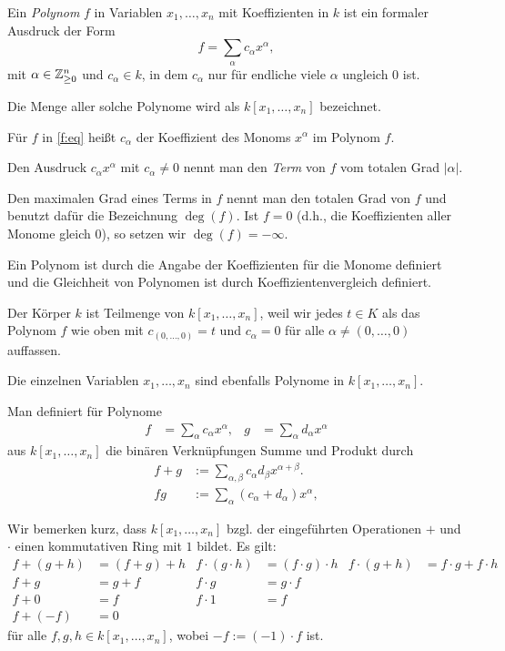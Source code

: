 \documentclass[11pt]{article}
\numberwithin{equation}{section}
\begin{document}
\begin{definition} \label{defn:pol}
	Ein \emph{Polynom} $f$ in Variablen $x_1,\ldots,x_n$ mit Koeffizienten in $k$ ist ein formaler Ausdruck der Form 
	\begin{equation} \label{f:eq} 
		f = \sum_\alpha c_\alpha x^ \alpha,
	\end{equation} 
  mit $\alpha \in \mathbb{Z}_{\ge 0}^n$ und $c_\alpha \in k$, in dem $c_\alpha$ nur für endliche viele $\alpha$ ungleich $0$ ist. 
  
  Die Menge aller solche Polynome wird als $k[x_1,\ldots,x_n]$ bezeichnet. 
  
  Für $f$ in \eqref{f:eq} heißt $c_\alpha$ der Koeffizient des Monoms $x^\alpha$ im Polynom $f$. 
  
  Den Ausdruck $c_\alpha x^\alpha$ mit $c_\alpha \ne 0$ nennt man den \emph{Term} von $f$ vom totalen Grad $|\alpha|$. 
  
  Den maximalen Grad eines Terms in $f$ nennt man den totalen Grad von $f$ und benutzt dafür die Bezeichnung $\deg (f)$. Ist $f=0$ (d.h., die Koeffizienten aller Monome gleich $0$), so setzen wir $\deg(f) = -\infty$. 
  
  Ein Polynom ist durch die Angabe der Koeffizienten für die Monome definiert und die Gleichheit von Polynomen ist durch Koeffizientenvergleich definiert. 
	
	Der Körper $k$ ist Teilmenge von $k[x_1,\ldots,x_n]$, weil wir jedes $t \in K$ als das Polynom $f$ wie oben mit 
	$c_{(0,\ldots,0)} =t$ und $c_\alpha = 0$ für alle $\alpha \ne (0,\ldots,0)$ auffassen. 
	
	Die einzelnen Variablen $x_1,\ldots,x_n$ sind ebenfalls Polynome in $k[x_1,\ldots,x_n]$. 
	
	Man definiert für Polynome 
	\begin{align*}
		f &  = \sum_\alpha c_\alpha x^\alpha, & g & = \sum_\alpha d_\alpha x^\alpha
	\end{align*} 
	aus $k[x_1,\ldots,x_n]$ die binären Verknüpfungen Summe und Produkt durch 
	\begin{align*}
			 f + g & := \sum_{\alpha, \beta} c_\alpha d_\beta x^{\alpha + \beta}. 
			\\ f g & := \sum_\alpha (c_\alpha + d_\alpha) x^\alpha, 
	\end{align*}
\end{definition} 

\begin{remark} 
Wir bemerken kurz, dass $k[x_1,\ldots,x_n]$ bzgl. der eingeführten Operationen $+$ und $\cdot$ einen kommutativen Ring mit $1$ bildet. Es gilt: 
\begin{align*} 
		f+(g+h) & = (f+g)+h 
		& 
		f \cdot (g \cdot h) & = (f \cdot g ) \cdot h
		& 
		f  \cdot (g+h) & = f  \cdot g + f  \cdot h
	\\ 
		 f+g  & = g+f  		
		 & 
		 f \cdot g & = g \cdot f  		
	\\ 
			f+0 & = f  
			&  
			f \cdot 1 & = f 
	\\ 
			f+ (-f) & = 0
\end{align*} 
für alle $f,g,h \in k [x_1,\ldots,x_n]$, wobei $-f := (-1) \cdot f$ ist. 
\end{remark} 
\end{document}
